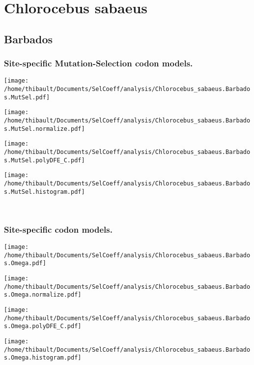 \section{Chlorocebus sabaeus} 
 
\subsection{Barbados} 
 
\subsubsection*{Site-specific Mutation-Selection codon models.} 
\begin{minipage}{0.49\linewidth} 
\texttt{[image: /home/thibault/Documents/SelCoeff/analysis/Chlorocebus\_sabaeus.Barbados.MutSel.pdf]} 
\end{minipage}
\begin{minipage}{0.49\linewidth} 
\texttt{[image: /home/thibault/Documents/SelCoeff/analysis/Chlorocebus\_sabaeus.Barbados.MutSel.normalize.pdf]} 
\end{minipage}
\begin{minipage}{0.49\linewidth} 
\texttt{[image: /home/thibault/Documents/SelCoeff/analysis/Chlorocebus\_sabaeus.Barbados.MutSel.polyDFE\_C.pdf]} 
\end{minipage}
\begin{minipage}{0.49\linewidth} 
\texttt{[image: /home/thibault/Documents/SelCoeff/analysis/Chlorocebus\_sabaeus.Barbados.MutSel.histogram.pdf]} 
\end{minipage}
\\ 
\subsubsection*{Site-specific codon models.} 
\begin{minipage}{0.49\linewidth} 
\texttt{[image: /home/thibault/Documents/SelCoeff/analysis/Chlorocebus\_sabaeus.Barbados.Omega.pdf]} 
\end{minipage}
\begin{minipage}{0.49\linewidth} 
\texttt{[image: /home/thibault/Documents/SelCoeff/analysis/Chlorocebus\_sabaeus.Barbados.Omega.normalize.pdf]} 
\end{minipage}
\begin{minipage}{0.49\linewidth} 
\texttt{[image: /home/thibault/Documents/SelCoeff/analysis/Chlorocebus\_sabaeus.Barbados.Omega.polyDFE\_C.pdf]} 
\end{minipage}
\begin{minipage}{0.49\linewidth} 
\texttt{[image: /home/thibault/Documents/SelCoeff/analysis/Chlorocebus\_sabaeus.Barbados.Omega.histogram.pdf]} 
\end{minipage}
\\ 
